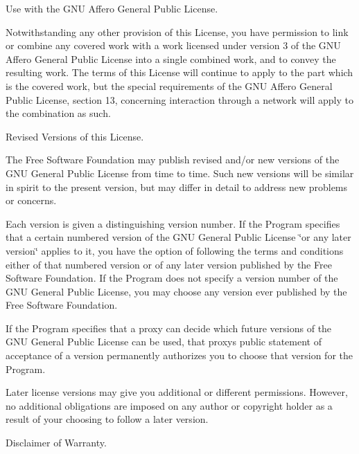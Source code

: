 \begin{DoxyEnumerate}
\item Use with the G\+N\+U Affero General Public License.
\end{DoxyEnumerate}

Notwithstanding any other provision of this License, you have permission to link or combine any covered work with a work licensed under version 3 of the G\+N\+U Affero General Public License into a single combined work, and to convey the resulting work. The terms of this License will continue to apply to the part which is the covered work, but the special requirements of the G\+N\+U Affero General Public License, section 13, concerning interaction through a network will apply to the combination as such.


\begin{DoxyEnumerate}
\item Revised Versions of this License.
\end{DoxyEnumerate}

The Free Software Foundation may publish revised and/or new versions of the G\+N\+U General Public License from time to time. Such new versions will be similar in spirit to the present version, but may differ in detail to address new problems or concerns.

Each version is given a distinguishing version number. If the Program specifies that a certain numbered version of the G\+N\+U General Public License \char`\"{}or any later version\char`\"{} applies to it, you have the option of following the terms and conditions either of that numbered version or of any later version published by the Free Software Foundation. If the Program does not specify a version number of the G\+N\+U General Public License, you may choose any version ever published by the Free Software Foundation.

If the Program specifies that a proxy can decide which future versions of the G\+N\+U General Public License can be used, that proxy\textquotesingle{}s public statement of acceptance of a version permanently authorizes you to choose that version for the Program.

Later license versions may give you additional or different permissions. However, no additional obligations are imposed on any author or copyright holder as a result of your choosing to follow a later version.


\begin{DoxyEnumerate}
\item Disclaimer of Warranty.
\end{DoxyEnumerate}

